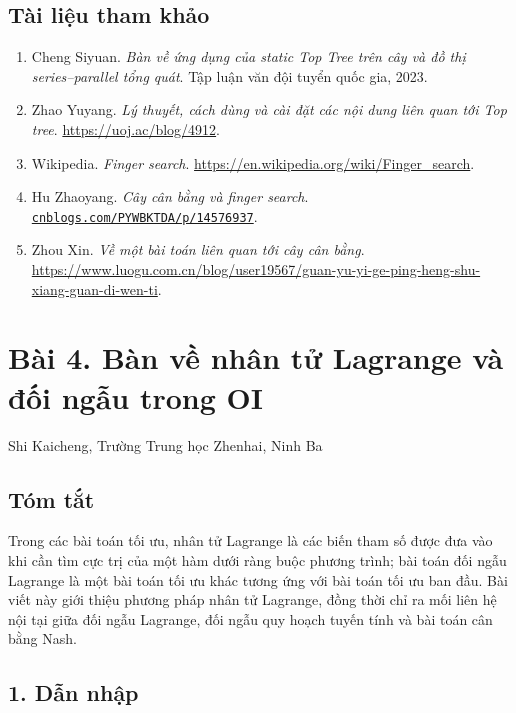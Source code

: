 \documentclass[11pt]{article}
\begin{document}
\subsection*{Tài liệu tham khảo}

\begin{enumerate}
  \item Cheng Siyuan. \emph{Bàn về ứng dụng của static Top Tree trên cây và đồ
  thị series--parallel tổng quát}. Tập luận văn đội tuyển quốc gia, 2023.
  \item Zhao Yuyang. \emph{Lý thuyết, cách dùng và cài đặt các nội dung liên
  quan tới Top tree}. \url{https://uoj.ac/blog/4912}.
  \item Wikipedia. \emph{Finger search}.
  \url{https://en.wikipedia.org/wiki/Finger_search}.
  \item Hu Zhaoyang. \emph{Cây cân bằng và finger search}.
  \href{https://www.cnblogs.com/PYWBKTDA/p/14576937}{\texttt{cnblogs.com/PYWBKTDA/p/14576937}}.
  \item Zhou Xin. \emph{Về một bài toán liên quan tới cây cân bằng}.
  \url{https://www.luogu.com.cn/blog/user19567/guan-yu-yi-ge-ping-heng-shu-xiang-guan-di-wen-ti}.
\end{enumerate}

\section*{Bài 4. Bàn về nhân tử Lagrange và đối ngẫu trong OI}

\begin{center}
Shi Kaicheng, Trường Trung học Zhenhai, Ninh Ba
\end{center}

\subsection*{Tóm tắt}

Trong các bài toán tối ưu, nhân tử Lagrange là các biến tham số được đưa vào
khi cần tìm cực trị của một hàm dưới ràng buộc phương trình; bài toán đối ngẫu
Lagrange là một bài toán tối ưu khác tương ứng với bài toán tối ưu ban đầu.
Bài viết này giới thiệu phương pháp nhân tử Lagrange, đồng thời chỉ ra mối liên
hệ nội tại giữa đối ngẫu Lagrange, đối ngẫu quy hoạch tuyến tính và bài toán
cân bằng Nash.

\subsection*{1. Dẫn nhập}
\end{document}
